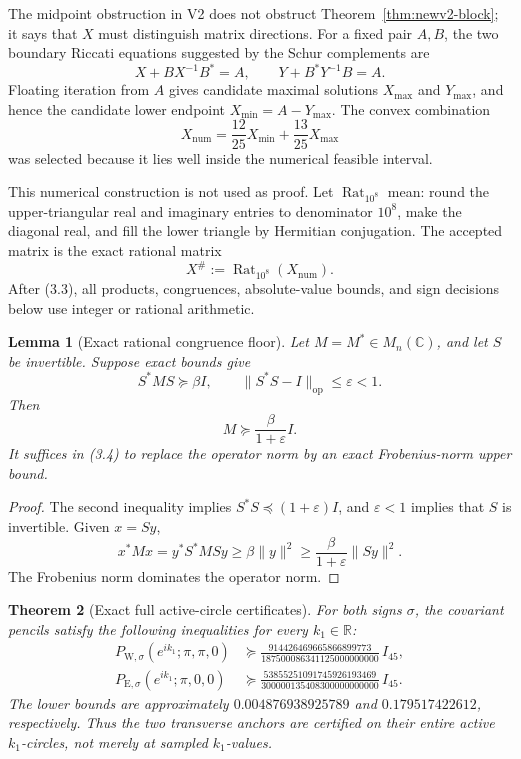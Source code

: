 \documentclass[11pt,oneside]{article}
\newtheorem{theorem}{Theorem}[section]
\newtheorem{lemma}[theorem]{Lemma}
\theoremstyle{definition}
\theoremstyle{remark}
\begin{document}
The midpoint obstruction in V2 does not obstruct
Theorem~\ref{thm:newv2-block}; it says that \(X\) must distinguish
matrix directions.  For a fixed pair \(A,B\), the two boundary
Riccati equations suggested by the Schur complements are
\[
 X+B X^{-1}B^*=A,\qquad
 Y+B^*Y^{-1}B=A.                                         \tag{3.1}
\]
Floating iteration from \(A\) gives candidate maximal solutions
\(X_{\max}\) and \(Y_{\max}\), and hence the candidate lower endpoint
\(X_{\min}=A-Y_{\max}\).  The convex combination
\[
 X_{\mathrm{num}}
 =\frac{12}{25}X_{\min}+\frac{13}{25}X_{\max}             \tag{3.2}
\]
was selected because it lies well inside the numerical feasible
interval.

This numerical construction is not used as proof.  Let
\(\operatorname{Rat}_{10^8}\) mean: round the upper-triangular real
and imaginary entries to denominator \(10^8\), make the diagonal
real, and fill the lower triangle by Hermitian conjugation.  The
accepted matrix is the exact rational matrix
\[
 X^\#:=\operatorname{Rat}_{10^8}(X_{\mathrm{num}}).       \tag{3.3}
\]
After (3.3), all products, congruences, absolute-value bounds, and
sign decisions below use integer or rational arithmetic.

\begin{lemma}[Exact rational congruence floor]
\label{lem:newv3-congruence}
Let \(M=M^*\in M_n(\mathbb C)\), and let \(S\) be invertible.  Suppose
exact bounds give
\[
 S^*MS\succeq\beta I,\qquad
 \|S^*S-I\|_{\mathrm{op}}\le\varepsilon<1.                \tag{3.4}
\]
Then
\[
 M\succeq\frac{\beta}{1+\varepsilon}I.                   \tag{3.5}
\]
It suffices in (3.4) to replace the operator norm by an exact
Frobenius-norm upper bound.
\end{lemma}

\begin{proof}
The second inequality implies
\(S^*S\preceq(1+\varepsilon)I\), and \(\varepsilon<1\)
implies that \(S\) is invertible.  Given \(x=Sy\),
\[
 x^*Mx=y^*S^*MSy\ge\beta\|y\|^2
 \ge\frac{\beta}{1+\varepsilon}\|Sy\|^2.
\]
The Frobenius norm dominates the operator norm.
\end{proof}

\begin{theorem}[Exact full active-circle certificates]
\label{thm:newv3-circles}
For both signs \(\sigma\), the covariant pencils satisfy the
following inequalities for every \(k_1\in\mathbb R\):
\[
\begin{aligned}
 P_{\mathrm W,\sigma}
 (e^{ik_1};\pi,\pi,0)
 &\succeq
 \frac{914426469665866899773}
 {187500086341125000000000}\,I_{45},\\
 P_{\mathrm E,\sigma}
 (e^{ik_1};\pi,0,0)
 &\succeq
 \frac{53855251091745926193469}
 {300000135408300000000000}\,I_{45}.
\end{aligned}
\tag{3.6}
\]
The lower bounds are approximately \(0.004876938925789\) and
\(0.179517422612\), respectively.  Thus the two transverse anchors
are certified on their entire active \(k_1\)-circles, not merely at
sampled \(k_1\)-values.
\end{theorem}
\end{document}
